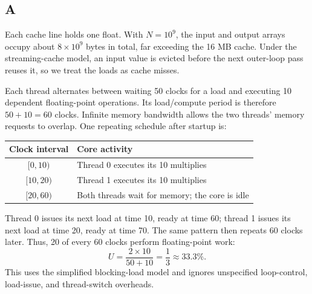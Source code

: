 \documentclass[letterpaper,12pt]{article}
\newenvironment{answer}{\par}{\par\medskip}
\begin{document}
\subsection*{A}
\begin{answer}
Each cache line holds one float. With $N=10^9$, the input and output arrays
occupy about $8\times10^9$ bytes in total, far exceeding the 16 MB cache.
Under the streaming-cache model, an input value is evicted before the next
outer-loop pass reuses it, so we treat the loads as cache misses.

Each thread alternates between waiting 50 clocks for a load and executing
10 dependent floating-point operations. Its load/compute period is therefore
$50+10=60$ clocks. Infinite memory bandwidth allows the two threads' memory
requests to overlap. One repeating schedule after startup is:

\begin{center}
\begin{tabular}{c|l}
  Clock interval & Core activity \\
  \hline
  $[0,10)$ & Thread 0 executes its 10 multiplies \\
  $[10,20)$ & Thread 1 executes its 10 multiplies \\
  $[20,60)$ & Both threads wait for memory; the core is idle
\end{tabular}
\end{center}

Thread 0 issues its next load at time 10, ready at time 60; thread 1 issues
its next load at time 20, ready at time 70. The same pattern then repeats
60 clocks later. Thus, 20 of every 60 clocks perform floating-point work:
\[
  U = \frac{2\times10}{50+10}
    = \boxed{\frac{1}{3}\approx33.3\%}.
\]
This uses the simplified blocking-load model and ignores unspecified
loop-control, load-issue, and thread-switch overheads.
\end{answer}

\clearpage
\end{document}
